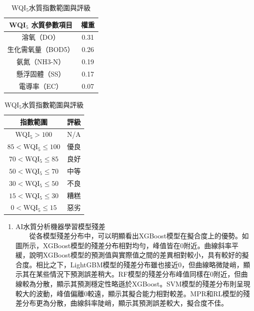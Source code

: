\documentclass[12pt,a4paper]{article}
\begin{document}
\begin{enumerate}
\begin{enumerate}[label=\arabic*.]
\begin{enumerate}[label=3-2-\arabic*.]
\begin{table}[H]
\begin{minipage}[t]{0.45\textwidth}
\begin{tabular}{cc}
                            \hline
                            WQI$_5$ 水質參數項目 & 權重 \\
                            \hline
                            溶氧（DO） & 0.31 \\
                            生化需氧量（BOD5） & 0.26 \\
                            氨氮（NH3-N） & 0.19 \\
                            懸浮固體（SS） & 0.17 \\
                            電導率（EC） & 0.07 \\
                            \hline
                        \end{tabular}
                        \label{table:wqi_weights}
                    \end{minipage}
                    \begin{minipage}[t]{0.45\textwidth}
                        \centering
                        \caption{WQI$_5$水質指數範圍與評級}
                        \begin{tabular}{cc}
                        \hline
                        指數範圍 & 評級 \\
                        \hline
                        WQI$_5>100$ & N/A \\
                        $85<$WQI$_5\leq100$ & 優良 \\
                        $70<$WQI$_5\leq85$ & 良好 \\
                        $50<$WQI$_5\leq70$ & 中等 \\
                        $30<$WQI$_5\leq50$ & 不良 \\
                        $15<$WQI$_5\leq30$ & 糟糕 \\
                        $0<$WQI$_5\leq15$ & 惡劣 \\
                        \hline
                    \end{tabular}
                    \label{table:wqi_grades}
                    \end{minipage}
            \end{table}
            \begin{enumerate}[label=\Alph*.]
                \item AI水質分析機器學習模型殘差\\
                　　從各模型殘差分布中，可以明顯看出XGBoost模型在擬合度上的優勢。如圖所示，XGBoost模型的殘差分布相對均勻，峰值皆在0附近。曲線斜率平緩，說明XGBoost模型的預測值與實際值之間的差異相對較小，具有較好的擬合度。相比之下，LightGBM模型的殘差分布雖也接近0，但曲線略微陡峭，顯示其在某些情況下預測誤差稍大。RF模型的殘差分布峰值同樣在0附近，但曲線較為分散，顯示其預測穩定性略遜於XGBoost。SVM模型的殘差分布則呈現較大的波動，峰值偏離0較遠，顯示其擬合能力相對較差。MPR和RL模型的殘差分布更為分散，曲線斜率陡峭，顯示其預測誤差較大，擬合度不佳。\\

\end{enumerate}
\end{enumerate}
\end{enumerate}
\end{enumerate}
\end{document}

